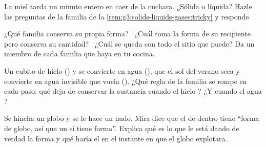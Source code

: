 \begin{exercise}[$\star$]\label{exo:g3:solids-liquids-gases:8}
La miel tarda un minuto entero en caer de la cuchara. ¿Sólida o
líquida? Hazle las preguntas de la familia de la
\cref{rem:g3:solids-liquids-gases:tricky} y responde.
\end{exercise}

\begin{exercise}[$\star$]\label{exo:g3:solids-liquids-gases:9}
¿Qué familia conserva su propia forma? \ ¿Cuál toma la forma de su
recipiente pero conserva su cantidad? \ ¿Cuál se queda con todo el
sitio que puede? Da un miembro de cada familia que haya en tu cocina.
\end{exercise}

\begin{exercise}[$\star\star$]\label{exo:g3:solids-liquids-gases:10}
Un cubito de hielo ()  y se convierte en agua
(), que el sol del verano seca y convierte en agua invisible
que vuela (). ¿Qué regla de la familia se rompe en cada paso: qué
deja de conservar la sustancia cuando el hielo ? ¿Y cuando
el agua ?
\end{exercise}

\begin{exercise}[$\star\star$]\label{exo:g3:solids-liquids-gases:11}
Se hincha un globo y se le hace un nudo. Mira dice que el  de
dentro tiene ``forma de globo, así que un  sí tiene forma''.
Explica qué es lo que le está dando de verdad la forma y qué haría el
 en el instante en que el globo explotara.
\end{exercise}
